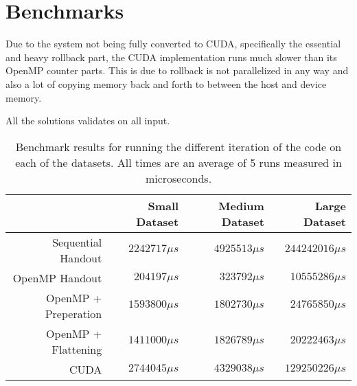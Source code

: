 \section{Benchmarks}
Due to the system not being fully converted to CUDA, specifically the essential and heavy rollback part, the CUDA implementation runs much slower than its OpenMP counter parts. This is due to rollback is not parallelized in any way and also a lot of copying memory back and forth to between the host and device memory.

All the solutions validates on all input.

\begin{table}[H]
    \centering
    \begin{tabular}{r|r|r|r}
                             &  Small Dataset & Medium Dataset &    Large Dataset \\ \hline
        Sequential Handout   & $2242717\mu s$ & $4925513\mu s$ & $244242016\mu s$ \\
        OpenMP Handout       &  $204197\mu s$ &  $323792\mu s$ &  $10555286\mu s$ \\
        OpenMP + Preperation & $1593800\mu s$ & $1802730\mu s$ &  $24765850\mu s$ \\
        OpenMP + Flattening  & $1411000\mu s$ & $1826789\mu s$ &  $20222463\mu s$ \\
        CUDA                 & $2744045\mu s$ & $4329038\mu s$ & $129250226\mu s$ \\
    \end{tabular}
    \caption{Benchmark results for running the different iteration of the code
        on each of the datasets. All times are an average of 5 runs measured in
        microseconds.}
    \label{tab:benchmarks}
\end{table}









